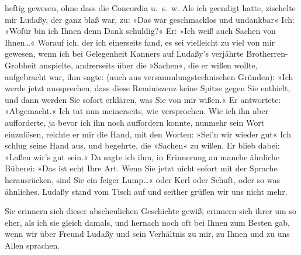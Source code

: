                heftig gewesen, ohne dass die Concordia u. s. w.
               Als ich geendigt hatte, zischelte mir Ludaßy,
               der ganz blaß war, zu: »Das war geschmacklos und undankbar{\dotstwo}« Ich: »Wofür bin ich Ihnen denn Dank schuldig?« Er: »Ich weiß auch Sachen von
                  Ihnen{\dots}« Worauf ich, der ich einerseits fand, es sei
               vielleicht zu viel von mir gewesen, wenn ich bei Gelegenheit Kanners auf Ludaßy’s
               verjährte Brotherren-Grobheit anspielte, andrerseits über die »Sachen«, die er wißen
               wollte, aufgebracht war, ihm sagte: (auch aus versammlungstechnischen Gründen): »Ich
               werde jetzt aussprechen, dass diese Reminiszenz keine Spitze gegen Sie enthielt, und
               dann werden Sie sofort erklären, was Sie von mir wißen.« Er antwortete: »Abgemacht.«
               Ich tat nun meinerseits, wie versprochen. Wie ich ihn aber aufforderte, ja bevor ich
               ihn noch auffordern konnte, nunmehr sein Wort einzulösen, reichte er mir die Hand,
               mit den Worten: »Sei’n wir wieder gut{\dotstwo}« Ich schlug seine
               Hand aus, und begehrte, die »Sachen« zu wißen. Er blieb dabei: »Laßen wir’s gut
               sein.« Da sagte ich ihm, in Erinnerung an manche ähnliche Büberei: »Das ist echt Ihre
               Art. Wenn Sie jetzt nicht sofort mit {\pb}der Sprache herausrücken, sind
               Sie ein feiger Lump{\dots}« oder Kerl {\dotstwo} oder Schuft, oder so was ähnliches. Ludaßy
               stand vom Tisch auf und seither grüßen wir uns nicht mehr.\pend
           
\pstart
           Sie erinnern sich dieser abscheulichen Geschichte gewiß; erinnern sich ihrer um so
               eher, als ich sie gleich damals, und hernach noch oft bei Ihnen zum Besten gab, wenn
               wir über Freund Ludaßy und sein Verhältnis zu
               mir, zu Ihnen und zu uns Allen sprachen.\pend
           
